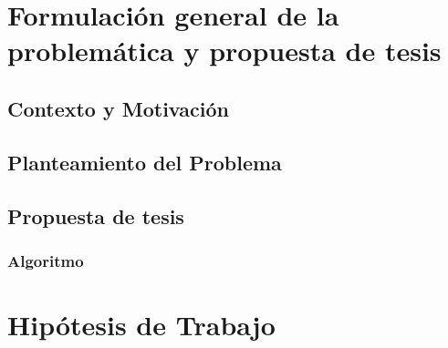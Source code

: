 \documentclass[12pt,spanish]{article}
\begin{document}
\vfill
\section{Formulación general de la problemática y propuesta de tesis}


\subsection{Contexto y Motivación}


\subsection{Planteamiento del Problema}


\subsection{Propuesta de tesis}


\subsubsection{Algoritmo}



\section{Hipótesis de Trabajo}

\newpage
\end{document}

